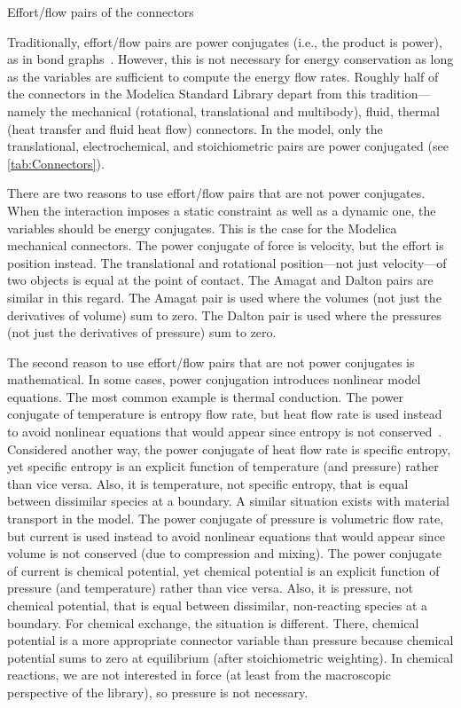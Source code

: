 \begin{sidewaystable}[hbtp]
  \caption{Effort\slash{}flow pairs of the connectors}
  \label{tab:Connectors}
  
\end{sidewaystable}

Traditionally, effort\slash{}flow pairs are power conjugates (i.e., the product is power), as in bond graphs~\cite{Borutzky2011}.  However, this is not necessary for energy conservation as long as the variables are sufficient to compute the energy flow rates.  Roughly half of the connectors in the Modelica Standard Library depart from this tradition---namely the mechanical (rotational, translational and multibody), fluid, thermal (heat transfer and fluid heat flow) connectors.  In the model, only the translational, electrochemical, and stoichiometric pairs are power conjugated (see \autoref{tab:Connectors}).

There are two reasons to use effort\slash{}flow pairs that are not power conjugates.  When the interaction imposes a static constraint as well as a dynamic one, the variables should be energy conjugates.  This is the case for the Modelica mechanical connectors.   The power conjugate of force is velocity, but the effort is position instead.  The translational and rotational position---not just velocity---of two objects is equal at the point of contact.  The Amagat and Dalton pairs are similar in this regard.  The Amagat pair is used where the volumes (not just the derivatives of volume) sum to zero.  The Dalton pair is used where the pressures (not just the derivatives of pressure) sum to zero.  

The second reason to use effort\slash{}flow pairs that are not power conjugates is mathematical.  In some cases, power conjugation introduces nonlinear model equations.  The most common example is thermal conduction.  The power conjugate of temperature is entropy flow rate, but heat flow rate is used instead to avoid nonlinear equations that would appear since entropy is not conserved~\cite{Hogan2006, Cellier1991}.  Considered another way, the power conjugate of heat flow rate is specific entropy, yet specific entropy is an explicit function of temperature (and pressure) rather than vice versa.  Also, it is temperature, not specific entropy, that is equal between dissimilar species at a boundary.  A similar situation exists with material transport in the model.  The power conjugate of pressure is volumetric flow rate, but current is used instead to avoid nonlinear equations that would appear since volume is not conserved (due to compression and mixing).  The power conjugate of current is chemical potential, yet chemical potential is an explicit function of pressure (and temperature) rather than vice versa.  Also, it is pressure, not chemical potential, that is equal between dissimilar, non-reacting species at a boundary.  For chemical exchange, the situation is different.  There, chemical potential is a more appropriate connector variable than pressure because chemical potential sums to zero at equilibrium (after stoichiometric weighting).  In chemical reactions, we are not interested in force (at least from the macroscopic perspective of the library), so pressure is not necessary.

